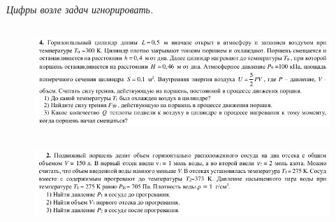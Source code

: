 \documentclass[a4paper,12pt]{article} %
\begin{document}
\textit{Цифры возле задач игнорировать.}

\subsection{}

\begin{figure}[h]
\centering
\includegraphics[width=\textwidth]{1.png}
\end{figure}



\subsection{}



\begin{figure}[h]
\centering
\includegraphics[width=\textwidth]{2.png}
\end{figure}
\end{document}
